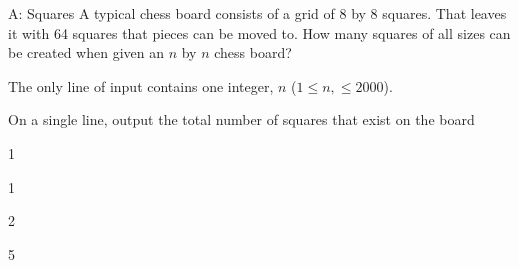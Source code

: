 \begin{problem}{A: Squares}
A typical chess board consists of a grid of 8 by 8 squares. That leaves it with 64 squares that pieces can be moved to. How many squares of all sizes can be created when given an $n$ by $n$ chess board?
\end{problem}

\begin{formalin}
The only line of input contains one integer, $n$ ($1 \leq n, \leq 2000$).
\end{formalin}

\begin{formalout}
On a single line, output the total number of squares that exist on the board
\end{formalout}

\begin{datain}
1
\end{datain}
\begin{dataout}
1
\end{dataout}

\begin{datain}
2
\end{datain}
\begin{dataout}
5
\end{dataout}